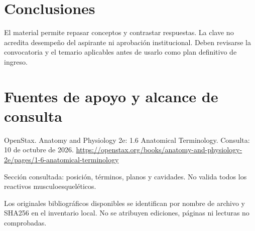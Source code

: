 \section{Conclusiones}
El material permite repasar conceptos y contrastar respuestas. La clave no acredita desempeño del aspirante ni aprobación institucional. Deben revisarse la convocatoria y el temario aplicables antes de usarlo como plan definitivo de ingreso.
\clearpage\section{Fuentes de apoyo y alcance de consulta}
OpenStax. Anatomy and Physiology 2e: 1.6 Anatomical Terminology. Consulta: 10 de octubre de 2026. \url{https://openstax.org/books/anatomy-and-physiology-2e/pages/1-6-anatomical-terminology}\par Sección consultada: posición, términos, planos y cavidades. No valida todos los reactivos musculoesqueléticos.\par\medskip
Los originales bibliográficos disponibles se identifican por nombre de archivo y SHA256 en el inventario local. No se atribuyen ediciones, páginas ni lecturas no comprobadas.

